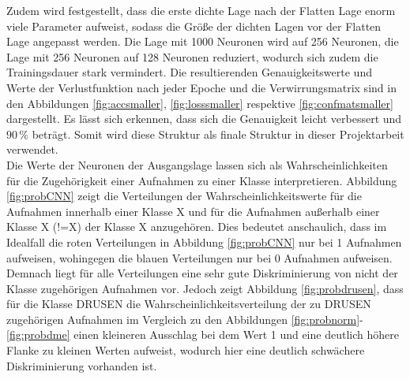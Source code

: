 \setcounter{subfigure}{0} 
Zudem wird festgestellt, dass die erste dichte Lage nach der Flatten Lage enorm viele Parameter aufweist, sodass die Größe der dichten Lagen vor der Flatten Lage angepasst werden. Die Lage mit 1000 Neuronen wird auf 256 Neuronen, die Lage mit 256 Neuronen auf 128 Neuronen reduziert, wodurch sich zudem die Trainingsdauer stark vermindert. Die resultierenden Genauigkeitswerte und Werte der Verlustfunktion nach jeder Epoche und die Verwirrungsmatrix sind in den Abbildungen \ref{fig:accsmaller}, \ref{fig:losssmaller} respektive \ref{fig:confmatsmaller} dargestellt. Es lässt sich erkennen, dass sich die Genauigkeit leicht verbessert und $90\,\%$ beträgt. Somit wird diese Struktur als finale Struktur in dieser Projektarbeit verwendet. \\
Die Werte der Neuronen der Ausgangslage lassen sich als Wahrscheinlichkeiten für die Zugehörigkeit einer Aufnahmen zu einer Klasse interpretieren. Abbildung \ref{fig:probCNN} zeigt die Verteilungen der Wahrscheinlichkeitswerte für die Aufnahmen innerhalb einer Klasse X und für die Aufnahmen außerhalb einer Klasse X (!=X) der Klasse X anzugehören. Dies bedeutet anschaulich, dass im Idealfall die roten Verteilungen in Abbildung \ref{fig:probCNN} nur bei 1 Aufnahmen aufweisen, wohingegen die blauen Verteilungen nur bei 0 Aufnahmen aufweisen. Demnach liegt für alle Verteilungen eine sehr gute Diskriminierung von nicht der Klasse zugehörigen Aufnahmen vor. Jedoch zeigt Abbildung \ref{fig:probdrusen}, dass für die Klasse DRUSEN die Wahrscheinlichkeitsverteilung der zu DRUSEN zugehörigen Aufnahmen im Vergleich zu den Abbildungen \ref{fig:probnorm}-\ref{fig:probdme} einen kleineren Ausschlag bei dem Wert 1 und eine deutlich höhere Flanke zu kleinen Werten aufweist, wodurch hier eine deutlich schwächere Diskriminierung vorhanden ist.  
 


